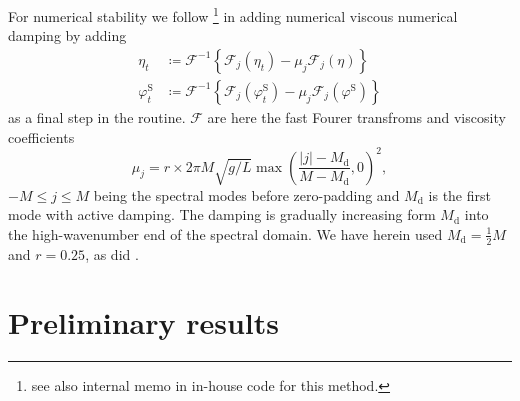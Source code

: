 \documentclass[internal]{sintefmemo}
\newcommand{\mr}{\mathrm}
\renewcommand{\S}{^\mr{S}}
\renewcommand{\_}[1]{_\mr{#1}}
\newcommand{\rbr}[1]{\left(#1\right)}
\newcommand{\cbr}[1]{\left\{#1\right\}}
\begin{document}
For numerical stability we follow \citet{chalikov2005modeling}\footnote{see also internal memo in in-house code for this method.}
in adding numerical viscous numerical damping by adding
\newcommand{\FF}{\mathcal F}
\begin{subequations}
\begin{align}
\eta_t &\coloneqq \FF^{-1}\cbr{\FF_j(\eta_t) - \mu_j \FF_j(\eta) }\\
\varphi\S_t &\coloneqq  \FF^{-1}\cbr{\FF_j(\varphi\S_t) - \mu_j \FF_j(\varphi\S) }
\end{align}%
\label{eq:damping}%
\end{subequations}
as a final step in the routine.
$\FF$ are here the fast Fourer transfroms and viscosity coefficients
\begin{equation}
\mu_j =r\times 2\pi M \sqrt{g/L}\max\rbr{\frac{|j|-M\_d}{M-M\_d},0 	}^2,
\label{eq:damping_nu}
\end{equation}
$-M\leq j \leq M$ being the spectral modes before zero-padding and $M\_d$ is the first mode with active damping.
The damping is gradually increasing form $M\_d$ into the high-wavenumber end of the spectral domain.
We have herein used $M\_d = \frac12 M$ and $r=0.25$, as did \citet{chalikov2005modeling}.

\section{Preliminary results}
\label{sec:results}







%

\appendix


%
\end{document}
